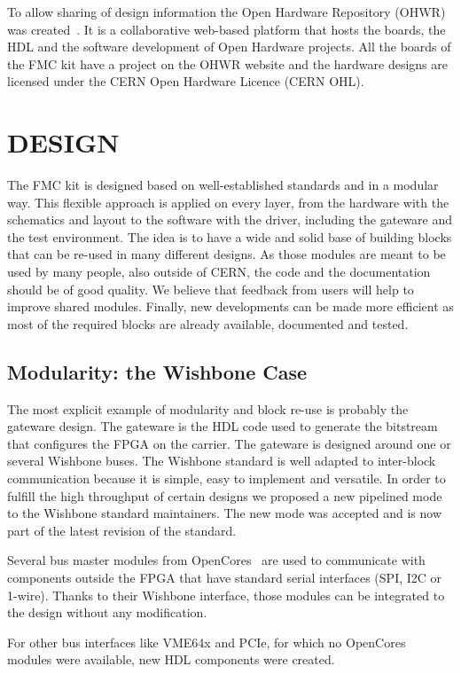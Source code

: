 \documentclass{JAC2003}
\begin{document}
To allow sharing of design information the Open Hardware Repository (OHWR) was created~\cite{icalepcs}.
It is a collaborative web-based platform that hosts the boards, the HDL and the software development of Open Hardware projects.
All the boards of the FMC kit have a project on the OHWR website and the hardware designs are licensed under the CERN Open Hardware Licence (CERN OHL).


\section{DESIGN}
The FMC kit is designed based on well-established standards and in a modular way.
This flexible approach is applied on every layer, from the hardware with the schematics and layout to the software with the driver, including the gateware and the test environment.
The idea is to have a wide and solid base of building blocks that can be re-used in many different designs.
As those modules are meant to be used by many people, also outside of CERN, the code and the documentation should be of good quality.
We believe that feedback from users will help to improve shared modules.
Finally, new developments can be made more efficient as most of the required blocks are already available, documented and tested.

\subsection{Modularity: the Wishbone Case}
The most explicit example of modularity and block re-use is probably the gateware design.
The gateware is the HDL code used to generate the bitstream that configures the FPGA on the carrier.
The gateware is designed around one or several Wishbone buses.
The Wishbone standard is well adapted to inter-block communication because it is simple, easy to implement and versatile.
In order to fulfill the high throughput of certain designs we proposed a new pipelined mode to the Wishbone standard maintainers. The new mode was accepted and is now part of the latest revision of the standard.

Several bus master modules from OpenCores~\cite{opencores} are used to communicate with components outside the FPGA that have standard serial interfaces (SPI, I2C or 1-wire).
Thanks to their Wishbone interface, those modules can be integrated to the design without any modification.

For other bus interfaces like VME64x and PCIe, for which no OpenCores modules were available, new HDL components were created.
\end{document}
